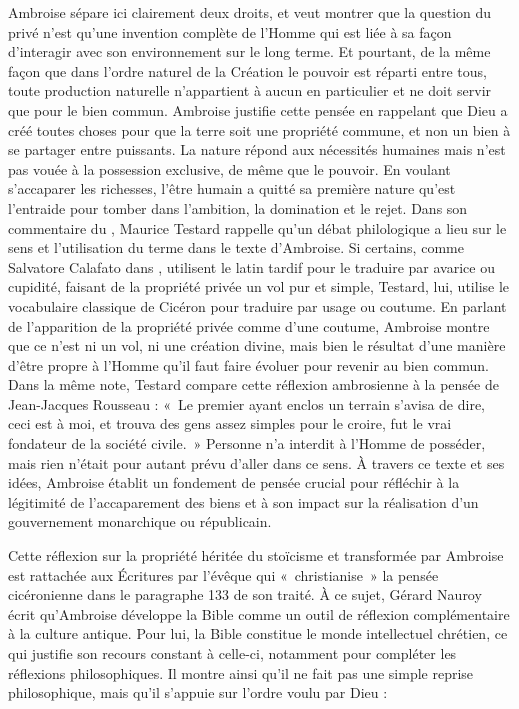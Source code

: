 \bigskip

Ambroise sépare ici clairement deux droits, et veut montrer que la question du privé n'est qu'une invention complète de l'Homme qui est liée à sa façon d'interagir avec son environnement sur le long terme. Et pourtant, de la même façon que dans l'ordre naturel de la Création le pouvoir est réparti entre tous, toute production naturelle n'appartient à aucun en particulier et ne doit servir que pour le bien commun. Ambroise justifie cette pensée en rappelant que Dieu a créé toutes choses pour que la terre soit une propriété commune, et non un bien à se partager entre puissants. La nature répond aux nécessités humaines mais n'est pas vouée à la possession exclusive, de même que le pouvoir. En voulant s'accaparer les richesses, l'être humain a quitté sa première nature qu'est l'entraide pour tomber dans l'ambition, la domination et le rejet. Dans son commentaire du , Maurice Testard rappelle qu'un débat philologique a lieu sur le sens et l'utilisation du terme  dans le texte d'Ambroise. Si certains, comme Salvatore Calafato dans , utilisent le latin tardif pour le traduire par avarice ou cupidité, faisant de la propriété privée un vol pur et simple, Testard, lui, utilise le vocabulaire classique de Cicéron pour traduire  par usage ou coutume\autocite[note 7, page 252]{ambroise_devoirs_1}. En parlant de l'apparition de la propriété privée comme d'une coutume, Ambroise montre que ce n'est ni un vol, ni une création divine, mais bien le résultat d'une manière d'être propre à l'Homme qu'il faut faire évoluer pour revenir au bien commun. Dans la même note, Testard compare cette réflexion ambrosienne à la pensée de Jean-Jacques Rousseau : «~Le premier ayant enclos un terrain s'avisa de dire, ceci est à moi, et trouva des gens assez simples pour le croire, fut le vrai fondateur de la société civile.~» Personne n'a interdit à l'Homme de posséder, mais rien n'était pour autant prévu d'aller dans ce sens. À travers ce texte et ses idées, Ambroise établit un fondement de pensée crucial pour réfléchir à la légitimité de l'accaparement des biens et à son impact sur la réalisation d'un gouvernement monarchique ou républicain.

\bigskip

Cette réflexion sur la propriété héritée du stoïcisme et transformée par Ambroise est rattachée aux Écritures par l'évêque qui «~christianise~» la pensée cicéronienne dans le paragraphe 133 de son traité. À ce sujet, Gérard Nauroy écrit qu'Ambroise développe la Bible comme un outil de réflexion complémentaire à la culture antique. Pour lui, la Bible constitue le monde intellectuel chrétien, ce qui justifie son recours constant à celle-ci, notamment pour compléter les réflexions philosophiques\autocite[383]{nauroy_ecriture}. Il montre ainsi qu'il ne fait pas une simple reprise philosophique, mais qu'il s'appuie sur l'ordre voulu par Dieu :

